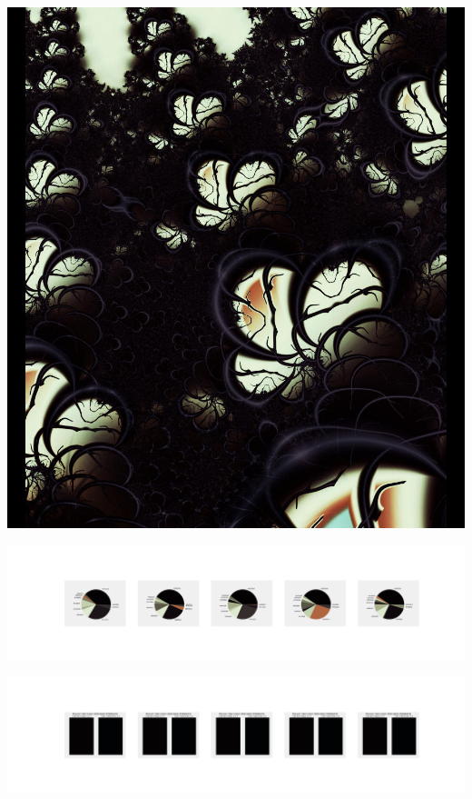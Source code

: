 \documentclass[11pt]{article}
\begin{document}
\begin{landscape}
    \begin{center}
    \includegraphics[width=\textwidth]{./nbimg/file (136).jpg}
    \end{center}

    \begin{center}
    \includegraphics[width=250mm]{./nbimg/pie-41.jpg}
    \end{center}

    \begin{center}
    \includegraphics[width=250mm]{./nbimg/peak-41.jpg}
    \end{center}
    


\end{landscape}
\end{document}
